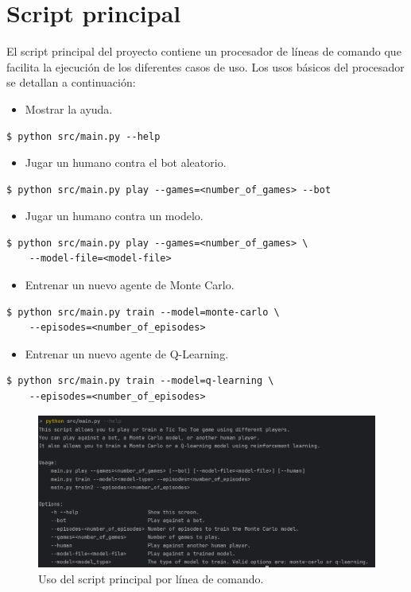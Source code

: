 
\chapter{Script principal} %

\label{Script principal}

El script principal del proyecto contiene un procesador de líneas de comando que facilita la ejecución de los diferentes casos de uso. Los usos básicos del procesador se detallan a continuación:

\begin{itemize}
    \item Mostrar la ayuda.
\end{itemize}
\begin{verbatim}
$ python src/main.py --help
\end{verbatim}

\begin{itemize}
    \item Jugar un humano contra el bot aleatorio.
\end{itemize}
\begin{verbatim}
$ python src/main.py play --games=<number_of_games> --bot
\end{verbatim}

\begin{itemize}
    \item Jugar un humano contra un modelo.
\end{itemize}
\begin{verbatim}
$ python src/main.py play --games=<number_of_games> \
    --model-file=<model-file>
\end{verbatim}

\begin{itemize}
    \item Entrenar un nuevo agente de Monte Carlo.
\end{itemize}
\begin{verbatim}
$ python src/main.py train --model=monte-carlo \
    --episodes=<number_of_episodes>
\end{verbatim}

\begin{itemize}
    \item Entrenar un nuevo agente de Q-Learning.
\end{itemize}
\begin{verbatim}
$ python src/main.py train --model=q-learning \
    --episodes=<number_of_episodes>
\end{verbatim}

\begin{figure}[htbp]
	\centering
	\includegraphics[width=\textwidth]{./Figures/command.png}
	\caption{Uso del script principal por línea de comando.}
	\label{fig:command}
\end{figure}
